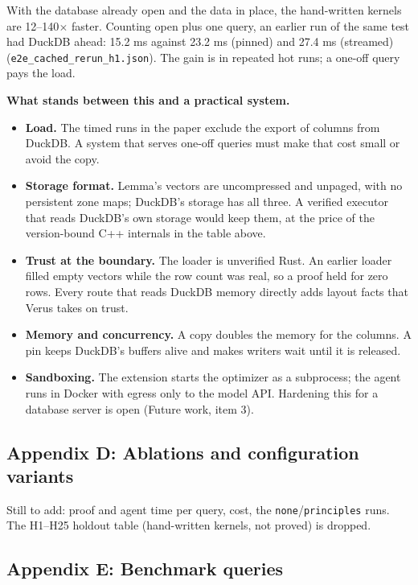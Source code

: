 \documentclass[
  10pt,
]{article}
\newcounter{none} %
\providecommand{\tightlist}{%
  \setlength{\itemsep}{0pt}\setlength{\parskip}{0pt}}
\begin{document}
With the database already open and the data in place, the hand-written
kernels are 12--140\ensuremath{\times} faster. Counting open plus one query, an earlier
run of the same test had DuckDB ahead: 15.2 ms against 23.2 ms (pinned)
and 27.4 ms (streamed) (\texttt{e2e\_cached\_rerun\_h1.json}). The gain
is in repeated hot runs; a one-off query pays the load.

\textbf{What stands between this and a practical system.}

\begin{itemize}
\tightlist
\item
  \textbf{Load.} The timed runs in the paper exclude the export of
  columns from DuckDB. A system that serves one-off queries must make
  that cost small or avoid the copy.
\item
  \textbf{Storage format.} Lemma's vectors are uncompressed and unpaged,
  with no persistent zone maps; DuckDB's storage has all three. A
  verified executor that reads DuckDB's own storage would keep them, at
  the price of the version-bound C++ internals in the table above.
\item
  \textbf{Trust at the boundary.} The loader is unverified Rust. An
  earlier loader filled empty vectors while the row count was real, so a
  proof held for zero rows. Every route that reads DuckDB memory
  directly adds layout facts that Verus takes on trust.
\item
  \textbf{Memory and concurrency.} A copy doubles the memory for the
  columns. A pin keeps DuckDB's buffers alive and makes writers wait
  until it is released.
\item
  \textbf{Sandboxing.} The extension starts the optimizer as a
  subprocess; the agent runs in Docker with egress only to the model
  API. Hardening this for a database server is open (Future work, item
  3).
\end{itemize}

\subsection{Appendix D: Ablations and configuration
variants}\label{appendix-d-ablations-and-configuration-variants}

Still to add: proof and agent time per query, cost, the
\texttt{none}/\texttt{principles} runs. The H1--H25 holdout table
(hand-written kernels, not proved) is dropped.

\subsection{Appendix E: Benchmark
queries}\label{appendix-e-benchmark-queries}
\end{document}
